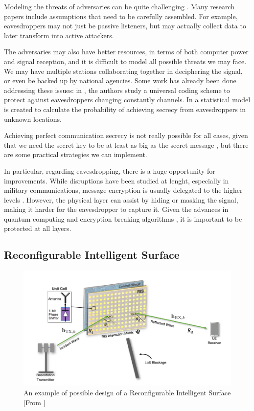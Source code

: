 
Modeling the threats of adversaries can be quite challenging \cite{7120011}. Many research papers include assumptions that need to be carefully assembled. For example, eavesdroppers may not just be passive listeners, but may actually collect data to later transform into active attackers.

The adversaries may also have better resources, in terms of both computer power and signal reception, and it is difficult to model all possible threats we may face. We may have multiple stations collaborating together in deciphering the signal, or even be backed up by national agencies. Some work has already been done addressing these issues: in \cite{5707054}, the authors study a universal coding scheme to protect against eavesdroppers changing constantly channels. In \cite{7543509} a statistical model is created to calculate the probability of achieving secrecy from eavesdroppers in unknown locations.


Achieving perfect communication secrecy is not really possible for all cases, given that we need the secret key to be at least as big as the secret message \cite{6769090}, but there are some practical strategies we can implement.

In particular, regarding eavesdropping, there is a huge opportunity for improvements. While disruptions have been studied at lenght, especially in military communications, message encryption is usually delegated to the higher levels \cite{6739367}. However, the physical layer can assist by hiding or masking the signal, making it harder for the eavesdropper to capture it. Given the advances in quantum computing and encryption breaking algorithms \cite{365700}, it is important to be protected at all layers.

\subsection{Reconfigurable Intelligent Surface}

\begin{figure}[H]
  \centering
  \includegraphics[width=0.5\linewidth]{imgs/RIS model.png}
  \caption{An example of possible design of a Reconfigurable Intelligent Surface [From \cite{9732917}]}
\end{figure}

